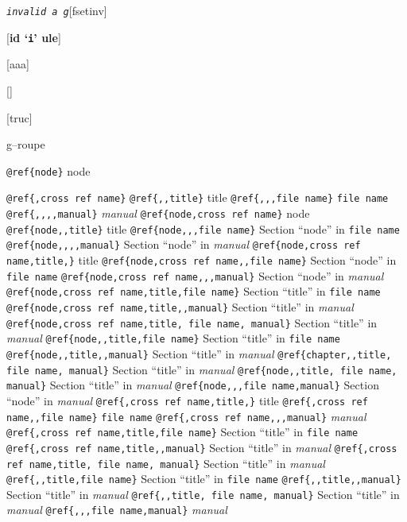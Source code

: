 \documentclass{book}
\begin{document}
\noindent\texttt{\textsl{invalid} \bgroup{}\normalfont{}\textsl{a g}\egroup{}}\hfill[fsetinv]



%
\noindent\texttt{}\hfill[\textbf{id `\texttt{i}' ule}]




\noindent\texttt{}\hfill[aaa]



\noindent\texttt{}\hfill[]



\noindent\texttt{}\hfill[truc]




g--roupe

\texttt{@ref\{node\}} node

\texttt{@ref\{,cross ref name\}} 
\texttt{@ref\{,,title\}} title
\texttt{@ref\{,,,file name\}} \texttt{file name}
\texttt{@ref\{,,,,manual\}} \textsl{manual}
\texttt{@ref\{node,cross ref name\}} node
\texttt{@ref\{node,,title\}} title
\texttt{@ref\{node,,,file name\}} Section ``node'' in \texttt{file name}
\texttt{@ref\{node,,,,manual\}} Section ``node'' in \textsl{manual}
\texttt{@ref\{node,cross ref name,title,\}} title
\texttt{@ref\{node,cross ref name,,file name\}} Section ``node'' in \texttt{file name}
\texttt{@ref\{node,cross ref name,,,manual\}} Section ``node'' in \textsl{manual}
\texttt{@ref\{node,cross ref name,title,file name\}} Section ``title'' in \texttt{file name}
\texttt{@ref\{node,cross ref name,title,,manual\}} Section ``title'' in \textsl{manual}
\texttt{@ref\{node,cross ref name,title, file name, manual\}} Section ``title'' in \textsl{manual}
\texttt{@ref\{node,,title,file name\}} Section ``title'' in \texttt{file name}
\texttt{@ref\{node,,title,,manual\}} Section ``title'' in \textsl{manual}
\texttt{@ref\{chapter,,title, file name, manual\}} Section ``title'' in \textsl{manual}
\texttt{@ref\{node,,title, file name, manual\}} Section ``title'' in \textsl{manual}
\texttt{@ref\{node,,,file name,manual\}} Section ``node'' in \textsl{manual}
\texttt{@ref\{,cross ref name,title,\}} title
\texttt{@ref\{,cross ref name,,file name\}} \texttt{file name}
\texttt{@ref\{,cross ref name,,,manual\}} \textsl{manual}
\texttt{@ref\{,cross ref name,title,file name\}} Section ``title'' in \texttt{file name}
\texttt{@ref\{,cross ref name,title,,manual\}} Section ``title'' in \textsl{manual}
\texttt{@ref\{,cross ref name,title, file name, manual\}} Section ``title'' in \textsl{manual}
\texttt{@ref\{,,title,file name\}} Section ``title'' in \texttt{file name}
\texttt{@ref\{,,title,,manual\}} Section ``title'' in \textsl{manual}
\texttt{@ref\{,,title, file name, manual\}} Section ``title'' in \textsl{manual}
\texttt{@ref\{,,,file name,manual\}} \textsl{manual}
\end{document}
